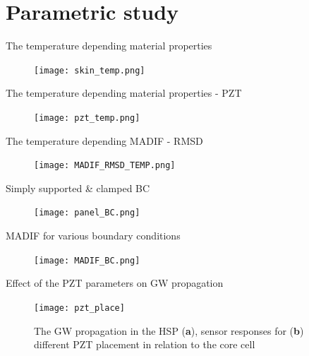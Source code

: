 \documentclass[10pt,aspectratio=169]{beamer} %
\begin{document}
\section{Parametric study}
\begin{frame}[label=frame24]{The temperature depending material properties}
	\begin{figure}
		\texttt{[image: skin\_temp.png]}
		\label{fig:SKIN_TEMP}
	\end{figure}
\end{frame}

\begin{frame}[label=frame24]{The temperature depending material properties - PZT}
	\begin{figure}
		\texttt{[image: pzt\_temp.png]}
		\label{fig:PZT_TEMP}
	\end{figure}
\end{frame}

\begin{frame}[label=frame24]{The temperature depending MADIF - RMSD}
	\begin{figure}
		\texttt{[image: MADIF\_RMSD\_TEMP.png]}
		\label{fig:MADIF_RMSD_TEMP}
	\end{figure}
\end{frame}

\begin{frame}[label=frame25]{Simply supported \& clamped BC}
	\begin{figure}
		\texttt{[image: panel\_BC.png]}
		\label{fig:panel_BC}
	\end{figure}
\end{frame}

\begin{frame}[label=frame25]{MADIF for various boundary conditions }
	\begin{figure}
		\texttt{[image: MADIF\_BC.png]}
		\label{fig:MADIF_CC_BC}
	\end{figure}
\end{frame}

\begin{frame}[label=frame25]{Effect of the PZT parameters on GW propagation}
	\begin{figure}
		\begin{center}
			\texttt{[image: pzt\_place]}
		\end{center}
		\caption{The GW propagation in the HSP (\textbf{a}), sensor responses for (\textbf{b}) different PZT placement in relation to the core cell}
		\label{fig:pzt_place}
	\end{figure}
\end{frame}
\end{document}
